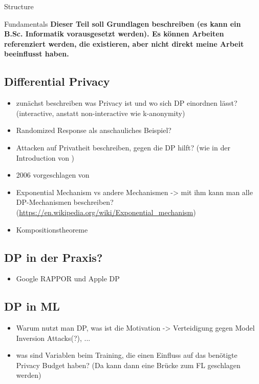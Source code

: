 \begin{chapter}{Structure}
	\begin{section}{Fundamentals}
		\textbf{Dieser Teil soll Grundlagen beschreiben (es kann ein B.Sc. Informatik vorausgesetzt werden). Es können Arbeiten referenziert werden, die existieren, aber nicht direkt meine Arbeit beeinflusst haben.}
		
		\subsection{Differential Privacy}
		\begin{itemize}
			\item zunächst beschreiben was Privacy ist und wo sich DP einordnen lässt? (interactive, anstatt non-interactive wie k-anonymity)
			\item Randomized Response als anschauliches Beispiel?
			\item Attacken auf Privatheit beschreiben, gegen die DP hilft? (wie in der Introduction von \cite{abadi:2016})
			\item 2006 vorgeschlagen von \cite{dwork:2006}
			\item Exponential Mechanism vs andere Mechanismen -> mit ihm kann man alle DP-Mechanismen beschreiben? (\url{https://en.wikipedia.org/wiki/Exponential_mechanism})
			\item Kompositionstheoreme
		\end{itemize}
		
		\subsection{DP in der Praxis?}
		\begin{itemize}
			\item Google RAPPOR und Apple DP
		\end{itemize}
		
		\subsection{DP in ML}
		\begin{itemize}
			\item Warum nutzt man DP, was ist die Motivation -> Verteidigung gegen Model Inversion Attacks(?), ...
			\item was sind Variablen beim Training, die einen Einfluss auf das benötigte Privacy Budget haben? (Da kann dann eine Brücke zum FL geschlagen werden)
		\end{itemize}
		

\end{section}
\end{chapter}
